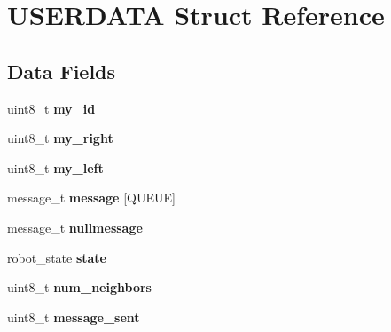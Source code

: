 \hypertarget{struct_u_s_e_r_d_a_t_a}{}\section{U\+S\+E\+R\+D\+A\+TA Struct Reference}
\label{struct_u_s_e_r_d_a_t_a}
\subsection*{Data Fields}
\begin{DoxyCompactItemize}
\item 
\mbox{\label{struct_u_s_e_r_d_a_t_a_aa9d08e528bddaed76cb3ae2b3924e324}} 
uint8\+\_\+t {\bfseries my\+\_\+id}
\item 
\mbox{\label{struct_u_s_e_r_d_a_t_a_acbbffd108b3e03fad207386744a5f5b7}} 
uint8\+\_\+t {\bfseries my\+\_\+right}
\item 
\mbox{\label{struct_u_s_e_r_d_a_t_a_a7011a389bc4e0674c6d0d3dd1890c1a3}} 
uint8\+\_\+t {\bfseries my\+\_\+left}
\item 
\mbox{\label{struct_u_s_e_r_d_a_t_a_abb890d1b5a40005df9eeb11eed697197}} 
message\+\_\+t {\bfseries message} \mbox{[}Q\+U\+E\+UE\mbox{]}
\item 
\mbox{\label{struct_u_s_e_r_d_a_t_a_a32f5a138afd30b969be3c2dc557e949c}} 
message\+\_\+t {\bfseries nullmessage}
\item 
\mbox{\label{struct_u_s_e_r_d_a_t_a_aadbb2fcd5b6edab38e3aa5aca6d92439}} 
robot\+\_\+state {\bfseries state}
\item 
\mbox{\label{struct_u_s_e_r_d_a_t_a_ad87a0d3ed21e9d4050ce0eb138cb75b8}} 
uint8\+\_\+t {\bfseries num\+\_\+neighbors}
\item 
\mbox{\label{struct_u_s_e_r_d_a_t_a_a83d1c1b9d1b27855cb1a36e755d73eb7}} 
uint8\+\_\+t {\bfseries message\+\_\+sent}
\item 
\mbox{\label{struct_u_s_e_r_d_a_t_a_a95a543e244114d2368350d934a7392a6}} 

\end{DoxyCompactItemize}
